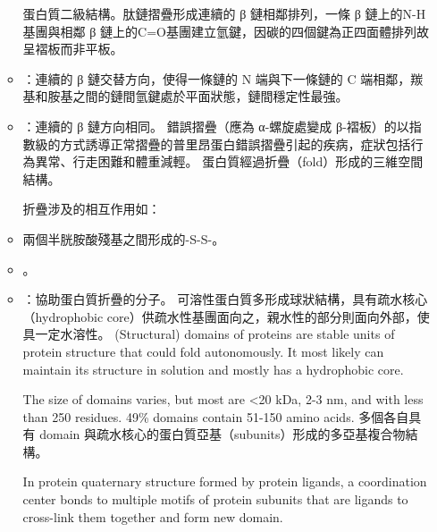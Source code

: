 \documentclass[a4paper,12pt]{report}
\begin{document}
\begin{itemize}
\begin{itemize}
\eit
\eit
{}
蛋白質二級結構。肽鏈摺疊形成連續的 β 鏈相鄰排列，一條 β 鏈上的N-H基團與相鄰 β 鏈上的C=O基團建立氫鍵，因碳的四個鍵為正四面體排列故呈褶板而非平板。
\bit
\item {}：連續的 β 鏈交替方向，使得一條鏈的 N 端與下一條鏈的 C 端相鄰，羰基和胺基之間的鏈間氫鍵處於平面狀態，鏈間穩定性最強。
\item {}：連續的 β 鏈方向相同。
\eit
{}
錯誤摺疊（應為 α-螺旋處變成 β-褶板）的以指數級的方式誘導正常摺疊的普里昂蛋白錯誤摺疊引起的疾病，症狀包括行為異常、行走困難和體重減輕。
蛋白質經過折疊（fold）形成的三維空間結構。

折疊涉及的相互作用如：
\bit
\item 兩個半胱胺酸殘基之間形成的-S-S-。
\item {}。
\item {}：協助蛋白質折疊的分子。
\eit
{}
可溶性蛋白質多形成球狀結構，具有疏水核心（hydrophobic core）供疏水性基團面向之，親水性的部分則面向外部，使具一定水溶性。
(Structural) domains of proteins are stable units of protein structure that could fold autonomously. It most likely can maintain its structure in solution and mostly has a hydrophobic core.

The size of domains varies, but most are <20 kDa, 2-3 nm, and with less than 250 residues. 49\% domains contain 51-150 amino acids.
多個各自具有 domain 與疏水核心的蛋白質亞基（subunits）形成的多亞基複合物結構。

In protein quaternary structure formed by protein ligands, a coordination center bonds to multiple motifs of protein subunits that are ligands to cross-link them together and form new domain.


\end{itemize}
\end{itemize}
\end{document}
